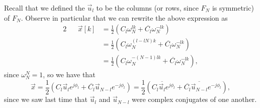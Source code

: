 \documentclass[letterpaper]{article}
\theoremstyle{remark}
\newcommand{\eqn}[1]{\begin{alignat*}{2}#1\end{alignat*}}
\begin{document}
Recall that we defined the $\vec{u}_l$ to be the columns (or rows, since $F_N$ is symmetric) of $F_N$. Observe in particular that we can rewrite the above expression as
\eqn{
    && \vec{x}[k] &= \frac{1}{2} (C_l\omega_N^{lk} + \overline{C_l}\omega_N^{-lk}) \\
    &&&= \frac{1}{2} (C_l\omega_N^{(l - lN)k} + \overline{C_l}\omega_N^{-lk}) \\
    &&&= \frac{1}{2} (C_l\omega_N^{-(N - 1)lk} + \overline{C_l}\omega_N^{-lk}),
}
since $\omega_N^N = 1$, so we have that
\[
    \vec{x} = \frac{1}{2} (C_l\vec{u}_l e^{j\phi_l} + \overline{C_l}\vec{u}_{N - l} e^{-j\phi_l}) = \frac{1}{2} (C_l\overline{\vec{u}_l} e^{j\phi_l} + \overline{C_l}\overline{\vec{u}_{N-l}} e^{-j\phi_l}),
\]
since we saw last time that $\vec{u}_l$ and $\vec{u}_{N-l}$ were complex conjugates of one another.
\end{document}
